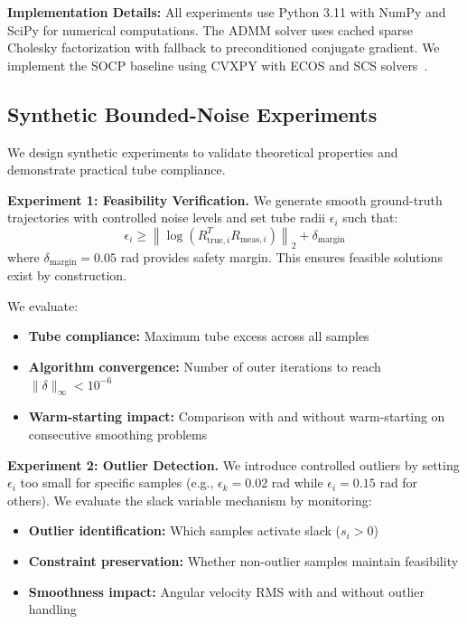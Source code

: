 \textbf{Implementation Details:} All experiments use Python 3.11 with NumPy and SciPy for numerical computations. The ADMM solver uses cached sparse Cholesky factorization with fallback to preconditioned conjugate gradient. We implement the SOCP baseline using CVXPY with ECOS and SCS solvers~\cite{boyd_scp}.

\subsection{Synthetic Bounded-Noise Experiments}

We design synthetic experiments to validate theoretical properties and demonstrate practical tube compliance.

\textbf{Experiment 1: Feasibility Verification.} We generate smooth ground-truth trajectories with controlled noise levels and set tube radii $\epsilon_i$ such that:
\begin{equation}
\epsilon_i \geq \left\| \log(R_{\text{true},i}^T R_{\text{meas},i}) \right\|_2 + \delta_{\text{margin}}
\end{equation}
where $\delta_{\text{margin}} = 0.05$ rad provides safety margin. This ensures feasible solutions exist by construction.

We evaluate:
\begin{itemize}
\item \textbf{Tube compliance:} Maximum tube excess across all samples
\item \textbf{Algorithm convergence:} Number of outer iterations to reach $\|\delta\|_\infty < 10^{-6}$
\item \textbf{Warm-starting impact:} Comparison with and without warm-starting on consecutive smoothing problems
\end{itemize}

\textbf{Experiment 2: Outlier Detection.} We introduce controlled outliers by setting $\epsilon_i$ too small for specific samples (e.g., $\epsilon_k = 0.02$ rad while $\epsilon_i = 0.15$ rad for others). We evaluate the slack variable mechanism by monitoring:

\begin{itemize}
\item \textbf{Outlier identification:} Which samples activate slack ($s_i > 0$)
\item \textbf{Constraint preservation:} Whether non-outlier samples maintain feasibility
\item \textbf{Smoothness impact:} Angular velocity RMS with and without outlier handling
\end{itemize}

